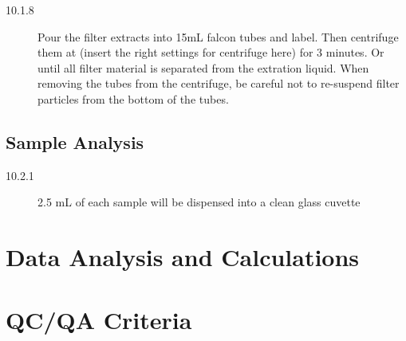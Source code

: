 \documentclass[12pt]{../SOP2}
\begin{document}
\begin{description}
\item[10.1.8] Pour the filter extracts into 15mL falcon tubes and label. Then centrifuge them at (insert the right settings for centrifuge here) for 3 minutes. Or until all filter material is separated from the extration liquid. When removing the tubes from the centrifuge, be careful not to re-suspend filter particles from the bottom of the tubes.
\end{description}
\subsection{Sample Analysis}
\begin{description}
\item[10.2.1] 2.5 mL of each sample will be dispensed into a clean glass cuvette
\end{description}

\section{Data Analysis and Calculations}

\section{QC/QA Criteria}
\end{document}
